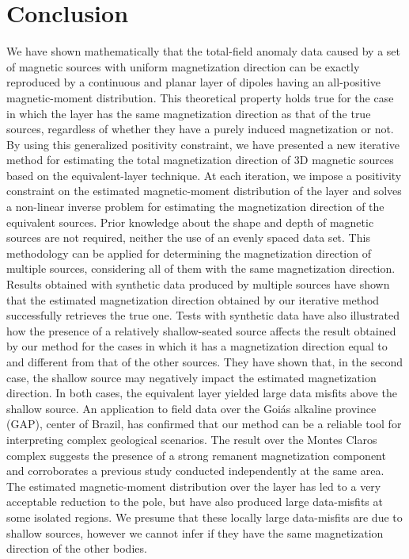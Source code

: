 \section{Conclusion}
\label{sec:conclusion}

We have shown mathematically that the total-field anomaly data caused by a set of magnetic sources
with uniform magnetization direction can be exactly reproduced by a continuous and planar layer of 
dipoles having an all-positive magnetic-moment distribution. 
This theoretical property holds true for the case in which the layer has the same
magnetization direction as that of the true sources, regardless of whether they have 
a purely induced magnetization or not.
By using this generalized positivity constraint, we have presented a new iterative method for 
estimating the total magnetization direction of 3D magnetic sources based on the equivalent-layer technique. 
At each iteration, we impose a positivity constraint on the estimated magnetic-moment distribution of the layer 
and solves a non-linear inverse problem for estimating the magnetization direction of the equivalent sources. 
Prior knowledge about the shape and depth of magnetic sources are not required, neither the use of an evenly spaced 
data set. This methodology can be applied for determining the magnetization direction of multiple sources, 
considering all of them with the same magnetization direction. 
Results obtained with synthetic data produced by multiple sources have shown that the estimated magnetization direction 
obtained by our iterative method successfully retrieves the true one.
Tests with synthetic data have also illustrated how the presence of a relatively shallow-seated source affects the 
result obtained by our method for the cases in which it has a magnetization direction equal to and different from that of
the other sources. They have shown that, in the second case, the shallow source may negatively impact the estimated magnetization 
direction. In both cases, the equivalent layer yielded large data misfits above the shallow source. 
An application to field data over the Goi{\' a}s alkaline province (GAP), center of Brazil, has confirmed that our method can 
be a reliable tool for interpreting complex geological scenarios. The result over the Montes Claros complex suggests the presence 
of a strong remanent magnetization component and corroborates a previous study conducted independently at the same area. 
The estimated magnetic-moment distribution over the layer has led to a very acceptable reduction to the pole, but have also 
produced large data-misfits at some isolated regions. We presume that these locally large data-misfits are due to shallow sources, 
however we cannot infer if they have the same magnetization direction of the other bodies.   
